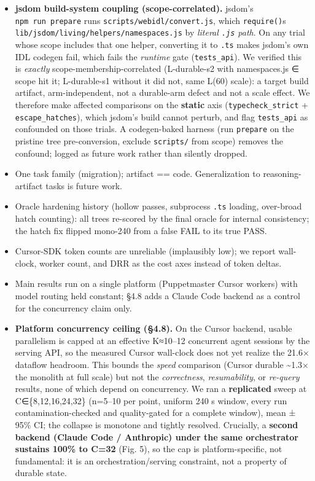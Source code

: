 \documentclass[
  10pt,
]{article}
\newcounter{none} %
\providecommand{\tightlist}{%
  \setlength{\itemsep}{0pt}\setlength{\parskip}{0pt}}
\begin{document}
\begin{itemize}
\tightlist
\item
  \textbf{jsdom build-system coupling (scope-correlated).} jsdom's
  \texttt{npm\ run\ prepare} runs \texttt{scripts/webidl/convert.js},
  which \texttt{require()}s
  \texttt{lib/jsdom/living/helpers/namespaces.js} by \emph{literal
  \texttt{.js} path}. On any trial whose scope includes that one helper,
  converting it to \texttt{.ts} makes jsdom's own IDL codegen fail,
  which fails the \emph{runtime} gate (\texttt{tests\_api}). We verified
  this is \emph{exactly} scope-membership-correlated (L-durable-s2 with
  namespaces.js ∈ scope hit it; L-durable-s1 without it did not, same
  L(60) scale): a target build artifact, arm-independent, not a
  durable-arm defect and not a scale effect. We therefore make affected
  comparisons on the \textbf{static} axis (\texttt{typecheck\_strict} +
  \texttt{escape\_hatches}), which jsdom's build cannot perturb, and
  flag \texttt{tests\_api} as confounded on those trials. A
  codegen-baked harness (run \texttt{prepare} on the pristine tree
  pre-conversion, exclude \texttt{scripts/} from scope) removes the
  confound; logged as future work rather than silently dropped.
\item
  One task family (migration); artifact == code. Generalization to
  reasoning-artifact tasks is future work.
\item
  Oracle hardening history (hollow passes, subprocess \texttt{.ts}
  loading, over-broad hatch counting): all trees re-scored by the final
  oracle for internal consistency; the hatch fix flipped mono-240 from a
  false FAIL to its true PASS.
\item
  Cursor-SDK token counts are unreliable (implausibly low); we report
  wall-clock, worker count, and DRR as the cost axes instead of token
  deltas.
\item
  Main results run on a single platform (Puppetmaster Cursor workers)
  with model routing held constant; §4.8 adds a Claude Code backend as a
  control for the concurrency claim only.
\item
  \textbf{Platform concurrency ceiling (§4.8).} On the Cursor backend,
  usable parallelism is capped at an effective K≈10--12 concurrent agent
  sessions by the serving API, so the measured Cursor wall-clock does
  not yet realize the 21.6× dataflow headroom. This bounds the
  \emph{speed} comparison (Cursor durable \textasciitilde1.3× the
  monolith at full scale) but not the \emph{correctness},
  \emph{resumability}, or \emph{re-query} results, none of which depend
  on concurrency. We ran a \textbf{replicated} sweep at
  C∈\{8,12,16,24,32\} (n=5--10 per point, uniform 240 s window, every
  run contamination-checked and quality-gated for a complete window),
  mean ± 95\% CI; the collapse is monotone and tightly resolved.
  Crucially, a \textbf{second backend (Claude Code / Anthropic) under
  the same orchestrator sustains 100\% to C=32} (Fig. 5), so the cap is
  platform-specific, not fundamental: it is an orchestration/serving
  constraint, not a property of durable state.
\end{itemize}
\end{document}
